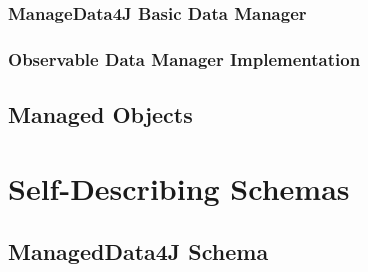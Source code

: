 
\subsubsection{ManageData4J Basic Data Manager}

\subsubsection{Observable Data Manager Implementation}

\subsection{Managed Objects}\label{sec:Managed Objects}

\section{Self-Describing Schemas}\label{SchemaSchema}

\subsection{ManagedData4J Schema}\label{sec:ManagedData4J Schema}


